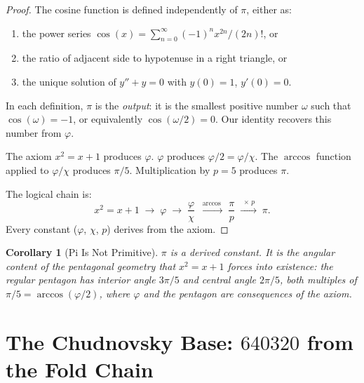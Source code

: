 \documentclass[11pt,a4paper]{article}
\theoremstyle{plain}
\newtheorem{corollary}[theorem]{Corollary}
\theoremstyle{definition}
\begin{document}
\begin{proof}
The cosine function is defined independently of $\pi$, either as:
\begin{enumerate}[nosep]
  \item the power series $\cos(x) = \sum_{n=0}^{\infty} (-1)^n x^{2n}/(2n)!$, or
  \item the ratio of adjacent side to hypotenuse in a right triangle, or
  \item the unique solution of $y'' + y = 0$ with $y(0) = 1$, $y'(0) = 0$.
\end{enumerate}
In each definition, $\pi$ is the \emph{output}: it is the smallest
positive number $\omega$ such that $\cos(\omega) = -1$, or equivalently
$\cos(\omega/2) = 0$. Our identity recovers this number from
$\varphi$.

The axiom $x^2 = x + 1$ produces $\varphi$.
$\varphi$ produces $\varphi/2 = \varphi/\chi$.
The $\arccos$ function applied to $\varphi/\chi$ produces $\pi/5$.
Multiplication by $p = 5$ produces $\pi$.

The logical chain is:
\[
  x^2 = x + 1 \;\to\; \varphi \;\to\; \frac{\varphi}{\chi}
  \;\xrightarrow{\;\arccos\;}\; \frac{\pi}{p}
  \;\xrightarrow{\;\times\, p\;}\; \pi.
\]
Every constant ($\varphi$, $\chi$, $p$) derives from the axiom.
\end{proof}

\begin{corollary}[Pi Is Not Primitive]\label{cor:not-primitive}
$\pi$ is a derived constant. It is the angular content of the pentagonal
geometry that $x^2 = x + 1$ forces into existence: the regular pentagon
has interior angle $3\pi/5$ and central angle $2\pi/5$, both multiples
of $\pi/5 = \arccos(\varphi/2)$, where $\varphi$ and the pentagon are
consequences of the axiom.
\end{corollary}

\section{The Chudnovsky Base: $640320$ from the Fold Chain}
\label{sec:640320}
\end{document}

